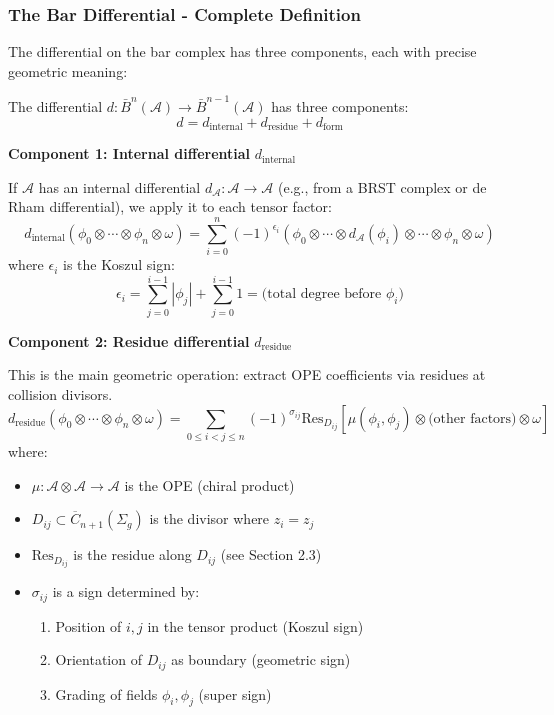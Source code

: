\subsubsection{The Bar Differential - Complete Definition}

The differential on the bar complex has three components, each with precise geometric meaning:

\begin{definition}\label{def:bar-differential-complete}
The differential $d: \bar{B}^n(\mathcal{A}) \to \bar{B}^{n-1}(\mathcal{A})$ has three components:
$$d = d_{\text{internal}} + d_{\text{residue}} + d_{\text{form}}$$

\textbf{Component 1: Internal differential} $d_{\text{internal}}$

If $\mathcal{A}$ has an internal differential $d_\mathcal{A}: \mathcal{A} \to \mathcal{A}$ (e.g., from a BRST complex or de Rham differential), we apply it to each tensor factor:
$$d_{\text{internal}}\left(\phi_0 \otimes \cdots \otimes \phi_n \otimes \omega\right) = \sum_{i=0}^n (-1)^{\epsilon_i} \left(\phi_0 \otimes \cdots \otimes d_\mathcal{A}(\phi_i) \otimes \cdots \otimes \phi_n \otimes \omega\right)$$
where $\epsilon_i$ is the Koszul sign:
$$\epsilon_i = \sum_{j=0}^{i-1} |\phi_j| + \sum_{j=0}^{i-1} 1 = \text{(total degree before } \phi_i\text{)}$$

\textbf{Component 2: Residue differential} $d_{\text{residue}}$

This is the main geometric operation: extract OPE coefficients via residues at collision divisors.
$$d_{\text{residue}}\left(\phi_0 \otimes \cdots \otimes \phi_n \otimes \omega\right) = \sum_{0 \leq i < j \leq n} (-1)^{\sigma_{ij}} \text{Res}_{D_{ij}}\left[\mu(\phi_i, \phi_j) \otimes \text{(other factors)} \otimes \omega\right]$$
where:
\begin{itemize}
\item $\mu: \mathcal{A} \otimes \mathcal{A} \to \mathcal{A}$ is the OPE (chiral product)
\item $D_{ij} \subset \overline{C}_{n+1}(\Sigma_g)$ is the divisor where $z_i = z_j$
\item $\text{Res}_{D_{ij}}$ is the residue along $D_{ij}$ (see Section 2.3)
\item $\sigma_{ij}$ is a sign determined by:
  \begin{enumerate}
  \item Position of $i,j$ in the tensor product (Koszul sign)
  \item Orientation of $D_{ij}$ as boundary (geometric sign)
  \item Grading of fields $\phi_i, \phi_j$ (super sign)
  \end{enumerate}
\end{itemize}


\end{definition}
